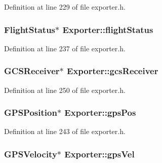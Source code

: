 Definition at line 229 of file exporter.\-h.

\hypertarget{group___mo_cap_plugin_ga63bef489a0fb9ccf02eadc577d487c10}{
\subsubsection[{flight\-Status}]{\setlength{\rightskip}{0pt plus 5cm}Flight\-Status$\ast$ Exporter\-::flight\-Status\hspace{0.3cm}{\ttfamily [protected]}}}\label{group___mo_cap_plugin_ga63bef489a0fb9ccf02eadc577d487c10}


Definition at line 237 of file exporter.\-h.

\hypertarget{group___mo_cap_plugin_ga49b2f0b0762b95f0da3f7c4a7330b941}{
\subsubsection[{gcs\-Receiver}]{\setlength{\rightskip}{0pt plus 5cm}G\-C\-S\-Receiver$\ast$ Exporter\-::gcs\-Receiver\hspace{0.3cm}{\ttfamily [protected]}}}\label{group___mo_cap_plugin_ga49b2f0b0762b95f0da3f7c4a7330b941}


Definition at line 250 of file exporter.\-h.

\hypertarget{group___mo_cap_plugin_gab8839ee3d842d22d5717905f7dea20cd}{
\subsubsection[{gps\-Pos}]{\setlength{\rightskip}{0pt plus 5cm}G\-P\-S\-Position$\ast$ Exporter\-::gps\-Pos\hspace{0.3cm}{\ttfamily [protected]}}}\label{group___mo_cap_plugin_gab8839ee3d842d22d5717905f7dea20cd}


Definition at line 243 of file exporter.\-h.

\hypertarget{group___mo_cap_plugin_ga75de3c84f1e0fec7aec493cb1a27b9a8}{
\subsubsection[{gps\-Vel}]{\setlength{\rightskip}{0pt plus 5cm}G\-P\-S\-Velocity$\ast$ Exporter\-::gps\-Vel\hspace{0.3cm}{\ttfamily [protected]}}}\label{group___mo_cap_plugin_ga75de3c84f1e0fec7aec493cb1a27b9a8}


